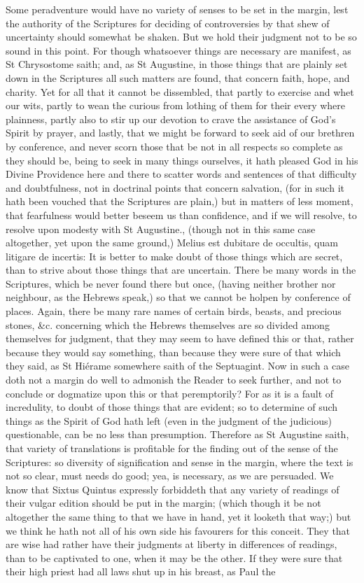 Some peradventure would have no variety of senses to be set in the margin, lest the authority of the Scriptures for deciding of controversies by that shew of uncertainty should somewhat be shaken. But we hold their judgment not to be so sound in this point. For though whatsoever things are necessary are manifest, as St Chrysostome saith; and, as St Augustine, in those things that are plainly set down in the Scriptures all such matters are found, that concern faith, hope, and charity. Yet for all that it cannot be dissembled, that partly to exercise and whet our wits, partly to wean the curious from lothing of them for their every where plainness, partly also to stir up our devotion to crave the assistance of God's Spirit by prayer, and lastly, that we might be forward to seek aid of our brethren by conference, and never scorn those that be not in all respects so complete as they should be, being to seek in many things ourselves, it hath pleased God in his Divine Providence here and there to scatter words and sentences of that difficulty and doubtfulness, not in doctrinal points that concern salvation, (for in such it hath been vouched that the Scriptures are plain,) but in matters of less moment, that fearfulness would better beseem us than confidence, and if we will resolve, to resolve upon modesty with St Augustine., (though not in this same case altogether, yet upon the same ground,) Melius est dubitare de occultis, quam litigare de incertis: It is better to make doubt of those things which are secret, than to strive about those things that are uncertain. There be many words in the Scriptures, which be never found there but once, (having neither brother nor neighbour, as the Hebrews speak,) so that we cannot be holpen by conference of places. Again, there be many rare names of certain birds, beasts, and precious stones, &c. concerning which the Hebrews themselves are so divided among themselves for judgment, that they may seem to have defined this or that, rather because they would say something, than because they were sure of that which they said, as St Hiérame somewhere saith of the Septuagint. Now in such a case doth not a margin do well to admonish the Reader to seek further, and not to conclude or dogmatize upon this or that peremptorily? For as it is a fault of incredulity, to doubt of those things that are evident; so to determine of such things as the Spirit of God hath left (even in the judgment of the judicious) questionable, can be no less than presumption. Therefore as St Augustine saith, that variety of translations is profitable for the finding out of the sense of the Scriptures: so diversity of signification and sense in the margin, where the text is not so clear, must needs do good; yea, is necessary, as we are persuaded. We know that Sixtus Quintus expressly forbiddeth that any variety of readings of their vulgar edition should be put in the margin; (which though it be not altogether the same thing to that we have in hand, yet it looketh that way;) but we think he hath not all of his own side his favourers for this conceit. They that are wise had rather have their judgments at liberty in differences of readings, than to be captivated to one, when it may be the other. If they were sure that their high priest had all laws shut up in his breast, as Paul the 